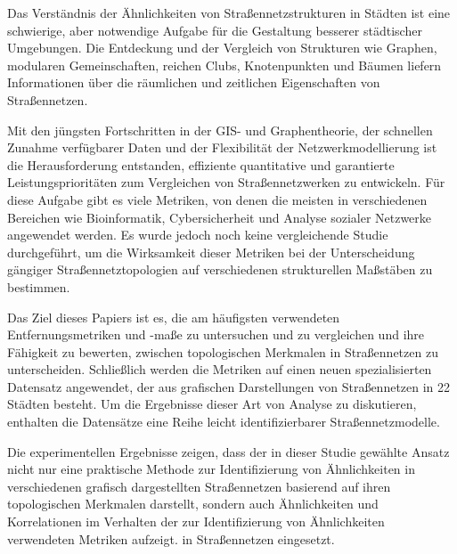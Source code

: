 
Das Verständnis der Ähnlichkeiten von Straßennetzstrukturen in Städten ist eine schwierige, aber notwendige Aufgabe für die Gestaltung besserer städtischer Umgebungen. Die Entdeckung und der Vergleich von Strukturen wie Graphen, modularen Gemeinschaften, reichen Clubs, Knotenpunkten und Bäumen liefern Informationen über die räumlichen und zeitlichen Eigenschaften von Straßennetzen.

Mit den jüngsten Fortschritten in der GIS- und Graphentheorie, der schnellen Zunahme verfügbarer Daten und der Flexibilität der Netzwerkmodellierung ist die Herausforderung entstanden, effiziente quantitative und garantierte Leistungsprioritäten zum Vergleichen von Straßennetzwerken zu entwickeln. Für diese Aufgabe gibt es viele Metriken, von denen die meisten in verschiedenen Bereichen wie Bioinformatik, Cybersicherheit und Analyse sozialer Netzwerke angewendet werden. Es wurde jedoch noch keine vergleichende Studie durchgeführt, um die Wirksamkeit dieser Metriken bei der Unterscheidung gängiger Straßennetztopologien auf verschiedenen strukturellen Maßstäben zu bestimmen.

Das Ziel dieses Papiers ist es, die am häufigsten verwendeten Entfernungsmetriken und -maße zu untersuchen und zu vergleichen und ihre Fähigkeit zu bewerten, zwischen topologischen Merkmalen in Straßennetzen zu unterscheiden. Schließlich werden die Metriken auf einen neuen spezialisierten Datensatz angewendet, der aus grafischen Darstellungen von Straßennetzen in 22 Städten besteht. Um die Ergebnisse dieser Art von Analyse zu diskutieren, enthalten die Datensätze eine Reihe leicht identifizierbarer Straßennetzmodelle.

Die experimentellen Ergebnisse zeigen, dass der in dieser Studie gewählte Ansatz nicht nur eine praktische Methode zur Identifizierung von Ähnlichkeiten in verschiedenen grafisch dargestellten Straßennetzen basierend auf ihren topologischen Merkmalen darstellt, sondern auch Ähnlichkeiten und Korrelationen im Verhalten der zur Identifizierung von Ähnlichkeiten verwendeten Metriken aufzeigt. in Straßennetzen eingesetzt.
